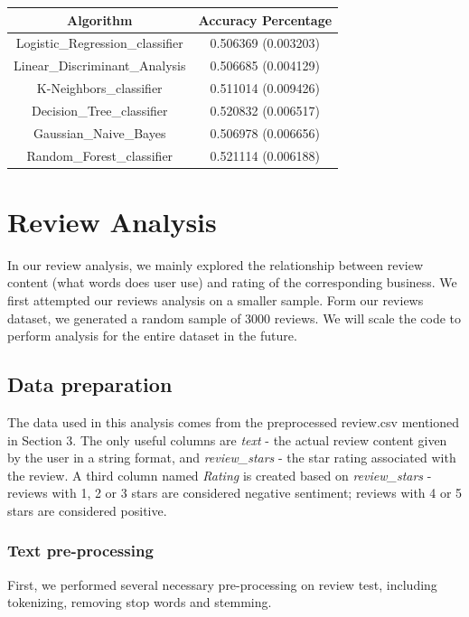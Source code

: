 \documentclass{article}
\begin{document}
\begin{table}[!ht]
\begin{center}
\begin{tabular}{ |c|c| } 
 \hline
Algorithm & Accuracy Percentage \\ 
  \hline
Logistic\_Regression\_classifier & 0.506369 (0.003203) \\ 
  \hline
Linear\_Discriminant\_Analysis & 0.506685 (0.004129) \\
  \hline
K-Neighbors\_classifier & 0.511014 (0.009426) \\
  \hline
Decision\_Tree\_classifier & 0.520832 (0.006517) \\
  \hline
Gaussian\_Naive\_Bayes & 0.506978 (0.006656) \\
  \hline
Random\_Forest\_classifier & 0.521114 (0.006188) \\
\hline
\end{tabular}
\end{center}
\end{table}

\section{Review Analysis}
In our review analysis, we mainly explored the relationship between review content (what words does user use) and rating of the corresponding business. We first attempted our reviews analysis on a smaller sample. Form our reviews dataset, we generated a random sample of 3000 reviews. We will scale the code to perform analysis for the entire dataset in the future. 

\subsection{Data preparation}
The data used in this analysis comes from the preprocessed review.csv mentioned in Section 3. The only useful columns are \textit{text} - the actual review content given by the user in a string format, and  \textit{review\_stars} - the star rating associated with the review. A third column named \textit{Rating} is created based on \textit{review\_stars} - reviews with 1, 2 or 3 stars are considered negative sentiment; reviews with 4 or 5 stars are considered positive.

\subsubsection{Text pre-processing}
First, we performed several necessary pre-processing on review test, including tokenizing, removing stop words and stemming.
\end{document}

